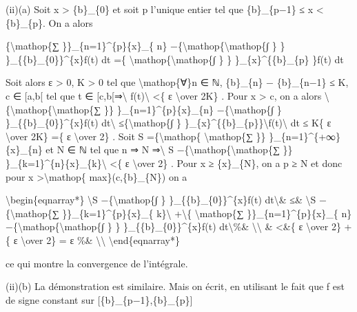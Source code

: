 \documentclass[]{article}
\begin{document}
(ii)(a) Soit x \textgreater{} \{b\}\_\{0\} et soit p l'unique entier tel
que \{b\}\_\{p−1\} ≤ x \textless{} \{b\}\_\{p\}. On a alors

\{\textbackslash{}mathop\{∑ \}\}\_\{n=1\}\^{}\{p\}\{x\}\_\{ n\}
−\{\textbackslash{}mathop\{\textbackslash{}mathop\{∫ \} \}
\}\_\{\{b\}\_\{0\}\}\^{}\{x\}f(t) dt =\{
\textbackslash{}mathop\{\textbackslash{}mathop\{∫ \} \}
\}\_\{x\}\^{}\{\{b\}\_\{p\} \}f(t) dt

Soit alors ε \textgreater{} 0, K \textgreater{} 0 tel que
\textbackslash{}mathop\{∀\}n ∈ ℕ, \{b\}\_\{n\} − \{b\}\_\{n−1\} ≤ K, c ∈
{[}a,b{[} tel que t ∈ {[}c,b{[}⇒\textbackslash{}\textbar{}
f(t)\textbackslash{}\textbar{} \textless{}\{ ε \textbackslash{}over 2K\}
. Pour x \textgreater{} c, on a alors
\textbackslash{}\textbar{}\{\textbackslash{}mathop\{\textbackslash{}mathop\{∑
\}\} \}\_\{n=1\}\^{}\{p\}\{x\}\_\{n\} −\{\textbackslash{}mathop\{∫ \}
\}\_\{\{b\}\_\{0\}\}\^{}\{x\}f(t) dt\textbackslash{}\textbar{}
≤\{\textbackslash{}mathop\{∫ \}
\}\_\{x\}\^{}\{\{b\}\_\{p\}\}\textbackslash{}\textbar{}f(t)\textbackslash{}\textbar{}
dt ≤ K\{ ε \textbackslash{}over 2K\} =\{ ε \textbackslash{}over 2\} .
Soit S =\{\textbackslash{}mathop\{ \textbackslash{}mathop\{∑ \}\}
\}\_\{n=1\}\^{}\{+∞\}\{x\}\_\{n\} et N ∈ ℕ tel que n ⇒ N
⇒\textbackslash{}\textbar{} S
−\{\textbackslash{}mathop\{\textbackslash{}mathop\{∑ \}\}
\}\_\{k=1\}\^{}\{n\}\{x\}\_\{k\}\textbackslash{}\textbar{} \textless{}\{
ε \textbackslash{}over 2\} . Pour x ≥ \{x\}\_\{N\}, on a p ≥ N et donc
pour x \textgreater{}\textbackslash{}mathop\{ max\}(c,\{b\}\_\{N\}) on a

\textbackslash{}begin\{eqnarray*\} \textbackslash{}\textbar{}S
−\{\textbackslash{}mathop\{∫ \} \}\_\{\{b\}\_\{0\}\}\^{}\{x\}f(t)
dt\textbackslash{}\textbar{}\& ≤\& \textbackslash{}\textbar{}S
−\{\textbackslash{}mathop\{∑ \}\}\_\{k=1\}\^{}\{p\}\{x\}\_\{
k\}\textbackslash{}\textbar{} +\textbackslash{}\textbar{}\{
\textbackslash{}mathop\{∑ \}\}\_\{n=1\}\^{}\{p\}\{x\}\_\{ n\}
−\{\textbackslash{}mathop\{\textbackslash{}mathop\{∫ \} \}
\}\_\{\{b\}\_\{0\}\}\^{}\{x\}f(t) dt\textbackslash{}\textbar{}\%\&
\textbackslash{}\textbackslash{} \& \textless{}\&\{ ε
\textbackslash{}over 2\} +\{ ε \textbackslash{}over 2\} = ε \%\&
\textbackslash{}\textbackslash{} \textbackslash{}end\{eqnarray*\}

ce qui montre la convergence de l'intégrale.

(ii)(b) La démonstration est similaire. Mais on écrit, en utilisant le
fait que f est de signe constant sur {[}\{b\}\_\{p−1\},\{b\}\_\{p\}{]}
\end{document}
